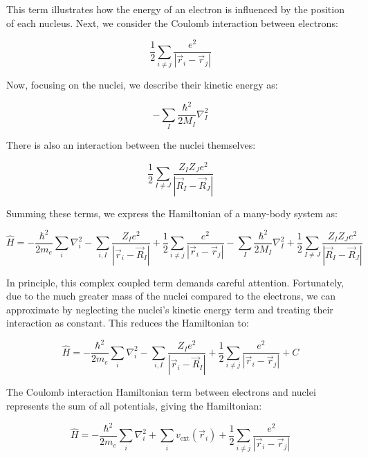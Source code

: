 This term illustrates how the energy of an electron is influenced by the position of each nucleus. Next, we consider the Coulomb interaction between electrons:

\begin{equation}
    \frac{1}{2}\sum_{i\neq j}\frac{e^2}{|\Vec{r}_i-\Vec{r}_j|}
    \label{electrons_Coulomb}
\end{equation}

Now, focusing on the nuclei, we describe their kinetic energy as:   

\begin{equation}
    -\sum_I\frac{\hbar^2}{2M_I}\nabla_I^2
    \label{nucleus_kinetic}
\end{equation}

There is also an interaction between the nuclei themselves:

\begin{equation}
    \frac{1}{2}\sum_{I\neq J}\frac{Z_I Z_J e^2}{|\Vec{R}_I-\Vec{R}_J|}
    \label{nucleus_interaction}
\end{equation}

Summing these terms, we express the Hamiltonian of a many-body system as:

\begin{equation}
    \hat{H}=-\frac{\hbar^2}{2m_e}\sum_i\nabla_i^2
    -\sum_{i,I}\frac{Z_I e^2}{|\Vec{r}_i-\Vec{R}_I|}
    +\frac{1}{2}\sum_{i\neq j}\frac{e^2}{|\Vec{r}_i-\Vec{r}_j|}
    -\sum_I\frac{\hbar^2}{2M_I}\nabla_I^2
    +\frac{1}{2}\sum_{I\neq J}\frac{Z_I Z_J e^2}{|\Vec{R}_I-\Vec{R}_J|}
    \label{full_many_body_hamiltonian}
\end{equation}

In principle, this complex coupled term demands careful attention. Fortunately, due to the much greater mass of the nuclei compared to the electrons, we can approximate by neglecting the nuclei’s kinetic energy term and treating their interaction as constant. This reduces the Hamiltonian to:

\begin{equation}
    \hat{H}=-\frac{\hbar^2}{2m_e}\sum_i\nabla_i^2
    -\sum_{i,I}\frac{Z_I e^2}{|\Vec{r}_i-\Vec{R}_I|}
    +\frac{1}{2}\sum_{i\neq j}\frac{e^2}{|\Vec{r}_i-\Vec{r}_j|}
    +C
    \label{many_body_hamiltonian}
\end{equation}

The Coulomb interaction Hamiltonian term between electrons and nuclei represents the sum of all potentials, giving the Hamiltonian:

\begin{equation}
    \hat{H}=-\frac{\hbar^2}{2m_e}\sum_i\nabla_i^2
    +\sum_i v_\text{ext}(\Vec{r}_i)
    +\frac{1}{2}\sum_{i\neq j}\frac{e^2}{|\Vec{r}_i-\Vec{r}_j|}
    \label{many_body_hamiltonian}
\end{equation}

